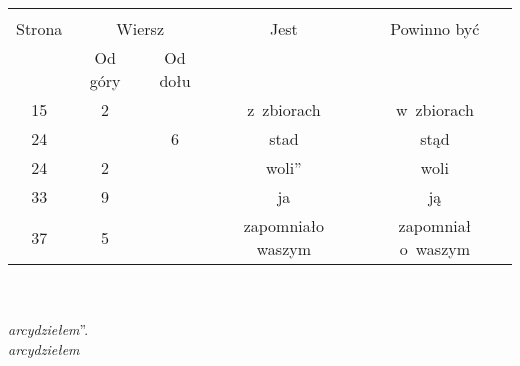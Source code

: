 \documentclass[a4paper,11pt]{article}
\begin{document}
\begin{center}
  \begin{tabular}{|c|c|c|c|c|}
    \hline
    & \multicolumn{2}{c|}{} & & \\
    Strona & \multicolumn{2}{c|}{Wiersz} & Jest
                              & Powinno być \\ \cline{2-3}
    & Od góry & Od dołu & & \\
    \hline
    15  &  2 & & z~zbiorach & w~zbiorach \\
    24  & &  6 & stad & stąd \\
    24  &  2 & & woli'' & woli \\
    33  &  9 & & ja & ją \\
    37  &  5 & & zapomniało waszym & zapomniał o~waszym \\
    \hline
  \end{tabular}
\end{center}
\noindent\\
 \\
\Jest \emph{arcydziełem}''. \\
\Pow \emph{arcydziełem} \\

\vspace{\spaceTwo}





\end{document}
